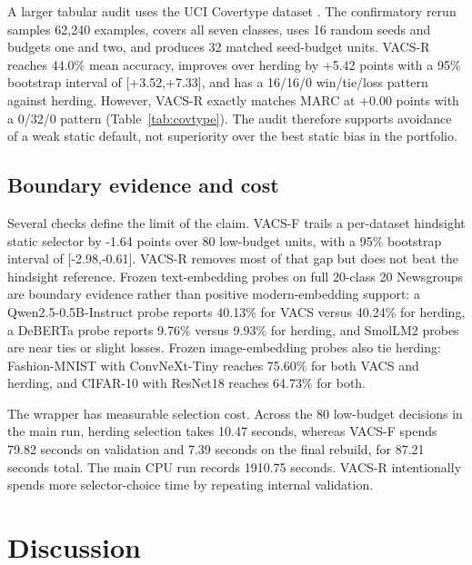 \documentclass[12pt]{article}
\begin{document}
A larger tabular audit uses the UCI Covertype dataset \citep{blackard1998covertype}. The confirmatory rerun samples 62,240 examples, covers all seven classes, uses 16 random seeds and budgets one and two, and produces 32 matched seed-budget units. VACS-R reaches 44.0\% mean accuracy, improves over herding by +5.42 points with a 95\% bootstrap interval of [+3.52,+7.33], and has a 16/16/0 win/tie/loss pattern against herding. However, VACS-R exactly matches MARC at +0.00 points with a 0/32/0 pattern (Table~\ref{tab:covtype}). The audit therefore supports avoidance of a weak static default, not superiority over the best static bias in the portfolio.

\begin{table}[H]
\centering
\caption{\textbf{Confirmatory Covertype audit.} The audit uses a fresh 62,240-example stratified sample and 32 matched seed-budget units. Values are percentages except for paired notes.}
\label{tab:covtype}
\small

\end{table}

\subsection*{Boundary evidence and cost}

Several checks define the limit of the claim. VACS-F trails a per-dataset hindsight static selector by -1.64 points over 80 low-budget units, with a 95\% bootstrap interval of [-2.98,-0.61]. VACS-R removes most of that gap but does not beat the hindsight reference. Frozen text-embedding probes on full 20-class 20 Newsgroups are boundary evidence rather than positive modern-embedding support: a Qwen2.5-0.5B-Instruct probe reports 40.13\% for VACS versus 40.24\% for herding, a DeBERTa probe reports 9.76\% versus 9.93\% for herding, and SmolLM2 probes are near ties or slight losses. Frozen image-embedding probes also tie herding: Fashion-MNIST with ConvNeXt-Tiny reaches 75.60\% for both VACS and herding, and CIFAR-10 with ResNet18 reaches 64.73\% for both.

The wrapper has measurable selection cost. Across the 80 low-budget decisions in the main run, herding selection takes 10.47 seconds, whereas VACS-F spends 79.82 seconds on validation and 7.39 seconds on the final rebuild, for 87.21 seconds total. The main CPU run records 1910.75 seconds. VACS-R intentionally spends more selector-choice time by repeating internal validation.

\section*{Discussion}
\end{document}
